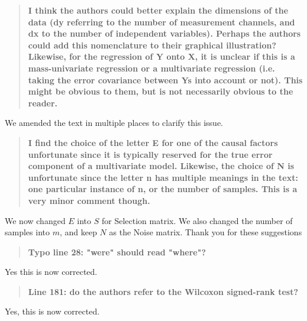 \documentclass[preprint,12pt,3p]{elsarticle}
\begin{document}
\begin{quote}\textbf{
I think the authors could better explain the dimensions of the data (dy
    referring to the number of measurement channels, and dx to the number of
    independent variables). Perhaps the authors could add this nomenclature to their
    graphical illustration? Likewise, for the regression of Y onto X, it is unclear
    if this is a mass-univariate regression or a multivariate regression (i.e.
    taking the error covariance between Ys into account or not). This might be
    obvious to them, but is not necessarily obvious to the reader.
}
\end{quote}
We amended the text in multiple places to clarify this issue.

\begin{quote}\textbf{
I find the choice of the letter E for one of the causal factors unfortunate
    since it is typically reserved for the true error component of a multivariate
    model. Likewise, the choice of N is unfortunate since the letter n has multiple
    meanings in the text: one particular instance of n, or the number of samples.
    This is a very minor comment though.
}
\end{quote}
We now changed $E$ into $S$ for Selection matrix. We also changed the number of
samples into $m$, and keep $N$ as the Noise matrix. Thank you for these suggestions

\begin{quote}\textbf{
Typo line 28: "were" should read "where"?
}
\end{quote}
Yes this is now corrected.

\begin{quote}\textbf{
Line 181: do the authors refer to the Wilcoxon signed-rank test?
}
\end{quote}
Yes, this is now corrected.
\end{document}
